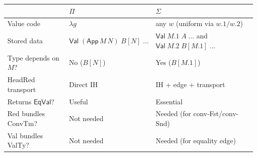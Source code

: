 \documentclass[11pt]{article}
\newcommand{\Val}{\mathsf{Val}}
\newcommand{\EqVal}{\mathsf{EqVal}}
\newcommand{\App}{\mathsf{App}}
\newcommand{\pj}[2]{#1\mbox{.}#2}
\begin{document}
\begin{center}
\begin{tabular}{l|l|l}
  & $\Pi$ & $\Sigma$ \\
\hline
Value code & $\lambda g$ & any $w$ (uniform via $\pj{w}{1}/\pj{w}{2}$) \\
Stored data & $\Val\;(\App\,M\,N)\;B[N]\;\ldots$ & $\Val\;\pj{M}{1}\;A\;\ldots$
  and $\Val\;\pj{M}{2}\;B[\pj{M}{1}]\;\ldots$ \\
Type depends on $M$? & No ($B[N]$) & Yes ($B[\pj{M}{1}]$) \\
HeadRed transport & Direct IH & IH + edge + transport \\
Returns $\EqVal$? & Useful & Essential \\
Red bundles ConvTm? & Not needed & Needed (for conv-Fst/conv-Snd) \\
Val bundles ValTy? & Not needed & Needed (for equality edge) \\
\end{tabular}
\end{center}
\end{document}
